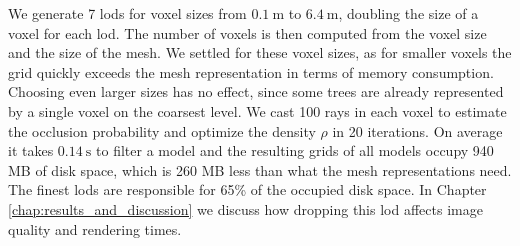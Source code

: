 We generate 7 \acsp{lod} for voxel sizes from $\SI{0.1}{\m}$ to $\SI{6.4}{\m}$, doubling the size of a voxel for each \ac{lod}.
The number of voxels is then computed from the voxel size and the size of the mesh.
We settled for these voxel sizes, as for smaller voxels the grid quickly exceeds the mesh representation in terms of memory consumption.
Choosing even larger sizes has no effect, since some trees are already represented by a single voxel on the coarsest level.
We cast 100 rays in each voxel to estimate the occlusion probability and optimize the density $\rho$ in 20 iterations. %
On average it takes $\SI{0.14}{\s}$ to filter a model and the resulting grids of all models occupy 940 MB of disk space, which is 260 MB less than what the mesh representations need.
The finest \acsp{lod} are responsible for 65\% of the occupied disk space.
In Chapter \ref{chap:results_and_discussion} we discuss how dropping this \ac{lod} affects image quality and rendering times.

